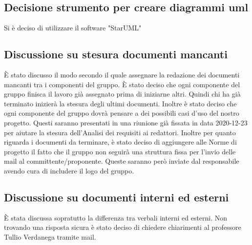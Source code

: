 \subsection*{Decisione strumento per creare diagrammi uml}
Si è deciso di utilizzare il software "StarUML"

\subsection*{Discussione su stesura documenti mancanti}
È stato discusso il modo secondo il quale assegnare la redazione dei documenti mancanti tra i componenti del gruppo. 
È stato deciso che ogni componente del gruppo finisca il lavoro già assegnato prima di iniziarne altri. Quindi chi ha già terminato inizierà la stesura degli ultimi documenti. 
Inoltre è stato deciso che ogni componente del gruppo dovrà pensare a dei possibili casi d'uso del nostro progetto. Questi saranno presentati in una riunione già fissata in data 2020-12-23 per aiutare la stesura dell'Analisi dei requisiti ai redattori. 
Inoltre per quanto riguarda i documenti da terminare, è stato deciso di aggiungere alle Norme di progetto il fatto che il gruppo non seguirà una struttura fissa per l'invio delle mail al committente/proponente. Queste saranno però inviate dal responsabile avendo cura di includere il logo del gruppo.

\subsection*{Discussione su documenti interni ed esterni}
È stata discussa sopratutto la differenza tra verbali interni ed esterni. Non trovando una risposta sicura è stato deciso di chiedere chiarimenti al professore Tullio Verdanega tramite mail.		


			





